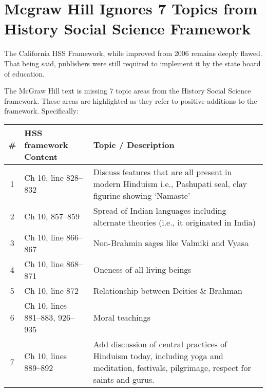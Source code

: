 \chapter{Mcgraw Hill Ignores 7 Topics from History Social Science Framework}

The California HSS Framework, while improved from 2006 remains deeply flawed. That being said, publishers were still required to implement it by the state board of education.

The McGraw Hill text is missing 7 topic areas from the History Social Science framework. These areas are highlighted as they refer to positive additions to the framework. Specifically:

\begin{longtable}{|c|p{3.5cm}|p{5.5cm}|}
\hline 
\# & HSS framework Content & Topic / Description\tabularnewline
\hline
1 & Ch 10, line 828--832 &  Discuss features that are all present in modern Hinduism i.e., Pashupati seal, clay figurine showing ‘Namaste’\tabularnewline
\hline
2 & Ch 10, 857--859 & Spread of Indian languages including alternate theories (i.e., it originated in India)\tabularnewline 
\hline
3 & Ch 10, line 866--867 & Non-Brahmin sages like Valmiki and Vyasa\tabularnewline
\hline
4 & Ch 10, line 868--871 & Oneness of all living beings\tabularnewline
\hline
5 & Ch 10, line 872 & Relationship between Deities \& Brahman\tabularnewline
\hline
6 & Ch 10, lines 881--883, 926--935 & Moral teachings\tabularnewline
\hline
7 & Ch 10, lines 889--892 & Add discussion of central practices of Hinduism today, including yoga and meditation, festivals, pilgrimage, respect for saints 
and gurus.\tabularnewline
\hline
\end{longtable}

